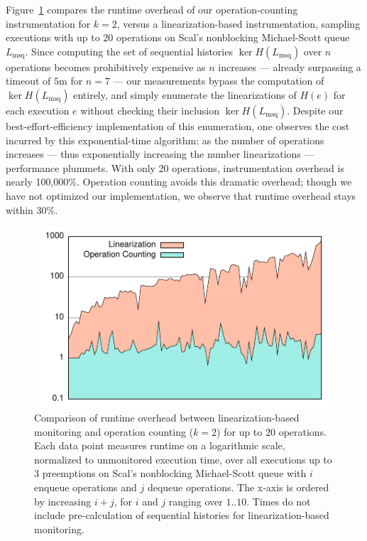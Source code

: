Figure~\ref{fig:data:runtime} compares the runtime overhead of our
operation-counting instrumentation for $k=2$, versus a linearization-based
instrumentation, sampling executions with up to $20$ operations on Scal's
nonblocking Michael-Scott queue $L_\mathrm{msq}$. Since computing the set of
sequential histories $\ker H(L_\mathrm{msq})$ over $n$ operations becomes
prohibitively expensive as $n$ increases --- already surpassing a timeout of
$5$m for $n=7$ --- our measurements bypass the computation of $\ker
H(L_\mathrm{msq})$ entirely, and simply enumerate the linearizations of $H(e)$
for each execution $e$ without checking their inclusion $\ker
H(L_\mathrm{msq})$. Despite our best-effort-efficiency implementation of this
enumeration, one observes the cost incurred by this exponential-time algorithm:
as the number of operations increases --- thus exponentially increasing the
number linearizations --- performance plummets. With only 20 operations,
instrumentation overhead is nearly 100,000\%. Operation counting avoids this
dramatic overhead; though we have not optimized our implementation, we observe
that runtime overhead stays within 30\%.

\begin{figure}
  \centering
  \includegraphics[width=\linewidth]{figures/lin-vs-counting-time}
  \caption{Comparison of runtime overhead between linearization-based monitoring
    and operation counting ($k=2$) for up to $20$ operations. Each data point
    measures runtime on a logarithmic scale, normalized to unmonitored
    execution time, over all executions up to $3$ preemptions on Scal's
    nonblocking Michael-Scott queue with $i$ enqueue operations and $j$ dequeue
    operations. The x-axis is ordered by increasing $i+j$, for $i$ and $j$
    ranging over $1..10$. Times do not include pre-calculation of sequential
    histories for linearization-based monitoring.
  }
  \label{fig:data:runtime}
\end{figure}

